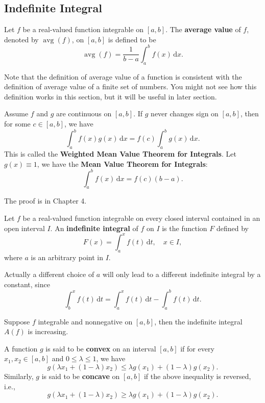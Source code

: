 \documentclass[a4paper]{ctexart}
\begin{document}
	\subsection{Indefinite Integral}
	\begin{mydef}
		Let $f$ be a real-valued function integrable on $[a,b]$. The \textbf{average value} of $f$, denoted by $\operatorname{avg}(f)$, on $[a,b]$ is defined to be
		\[
		\operatorname{avg}(f)=\frac{1}{b-a}\int_a^b f(x)\,\mathrm{d}x.
		\]
	\end{mydef}
    \begin{myrmk}
		Note that the definition of average value of a function is consistent with the definition of average value of a finite set of numbers. You might not see how this definition works in this section, but it will be useful in later section.
	\end{myrmk}
    \begin{mythm}
        Assume $f$ and $g$ are continuous on $[a,b]$. If $g$ never changes sign on $[a,b]$, then for some $c\in[a,b]$, we have
        \[
        \int_a^b f(x)g(x)\,\mathrm{d}x = f(c)\int_a^b g(x)\,\mathrm{d}x.
        \]
        This is called the \textbf{Weighted Mean Value Theorem for Integrals}.
        Let $g(x)\equiv 1$, we have the \textbf{Mean Value Theorem for Integrals}:
        \[
        \int_a^b f(x)\,\mathrm{d}x = f(c)(b-a).
        \]
    \end{mythm}
    \begin{myrmk}
        The proof is in Chapter 4.
    \end{myrmk}
	\begin{mydef}
		Let $f$ be a real-valued function integrable on every closed interval contained in an open interval $I$. An \textbf{indefinite integral} of $f$ on $I$ is the function $F$ defined by
		\[
		F(x)=\int_a^x f(t)\,\mathrm{d}t,\quad x\in I,
		\]
		where $a$ is an arbitrary point in $I$.
	\end{mydef}
	\begin{myrmk}
		Actually a different choice of $a$ will only lead to a different indefinite integral by a constant, since
		\[
		\int_b^x f(t)\,\mathrm{d}t = \int_a^x f(t)\,\mathrm{d}t - \int_a^b f(t)\,\mathrm{d}t.
		\]
	\end{myrmk}
	\begin{mythm}
		Suppose $f$ integrable and nonnegative on $[a,b]$, then the indefinite integral $A(f)$ is increasing.
	\end{mythm}
	\begin{mydef}
		A function $g$ is said to be \textbf{convex} on an interval $[a,b]$ if for every $x_1,x_2\in [a,b]$ and $0\le \lambda \le 1$, we have
		\[
		g\left(\lambda x_1 + (1-\lambda)x_2\right) \le \lambda g(x_1) + (1-\lambda)g(x_2).
		\]
		Similarly, $g$ is said to be \textbf{concave} on $[a,b]$ if the above inequality is reversed, i.e.,
		\[
		g\left(\lambda x_1 + (1-\lambda)x_2\right) \ge \lambda g(x_1) + (1-\lambda)g(x_2).
		\]
	\end{mydef}
\end{document}
